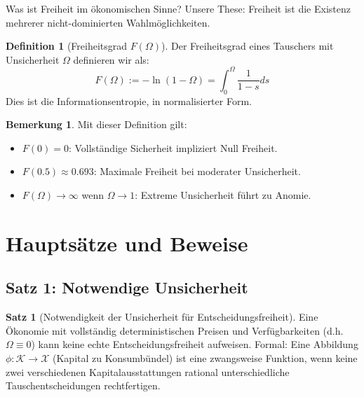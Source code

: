 \documentclass[a4paper, 12pt, twoside, openright]{report}
\theoremstyle{definition}
\newtheorem{definition}[theorem]{Definition}
\theoremstyle{definition}
\newtheorem{satz}{Satz}[chapter]
\newtheorem{bemerkung}{Bemerkung}[chapter]
\begin{document}
Was ist Freiheit im ökonomischen Sinne? Unsere These: Freiheit ist die Existenz mehrerer nicht-dominierten Wahlmöglichkeiten.

\begin{definition}[Freiheitsgrad $F(\Omega)$]
    Der Freiheitsgrad eines Tauschers mit Unsicherheit $\Omega$ definieren wir als:
    \begin{equation}
        F(\Omega) := -\ln(1 - \Omega) = \int_0^{\Omega} \frac{1}{1-s} ds
    \end{equation}
    Dies ist die Informationsentropie, in normalisierter Form.
\end{definition}

\begin{bemerkung}
    Mit dieser Definition gilt:
    \begin{itemize}
        \item $F(0) = 0$: Vollständige Sicherheit impliziert Null Freiheit.
        \item $F(0.5) \approx 0.693$: Maximale Freiheit bei moderater Unsicherheit.
        \item $F(\Omega) \to \infty$ wenn $\Omega \to 1$: Extreme Unsicherheit führt zu Anomie.
    \end{itemize}
\end{bemerkung}

\section{Hauptsätze und Beweise}

\subsection{Satz 1: Notwendige Unsicherheit}

\begin{satz}[Notwendigkeit der Unsicherheit für Entscheidungsfreiheit]
    \label{satz:notwendige_unsicherheit}
    Eine Ökonomie mit vollständig deterministischen Preisen und Verfügbarkeiten (d.h. $\Omega \equiv 0$) kann keine echte Entscheidungsfreiheit aufweisen. Formal: Eine Abbildung $\phi: \mathcal{K} \to \mathcal{X}$ (Kapital zu Konsumbündel) ist eine zwangsweise Funktion, wenn keine zwei verschiedenen Kapitalausstattungen rational unterschiedliche Tauschentscheidungen rechtfertigen.
\end{satz}
\end{document}
